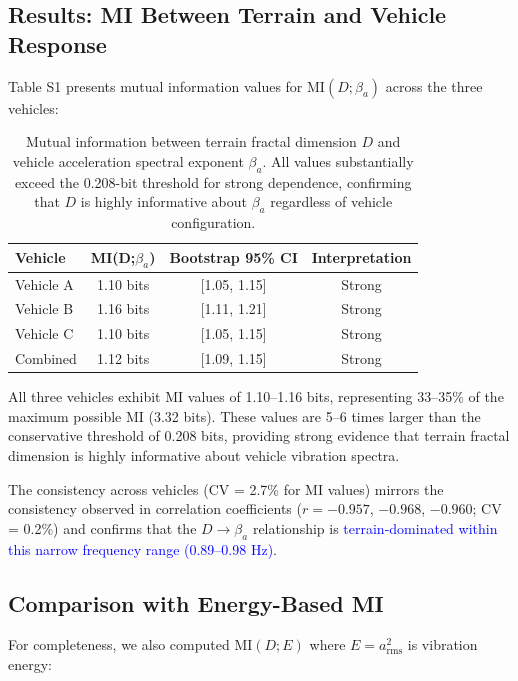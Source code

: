 \documentclass[11pt]{article}
\begin{document}
\subsection{Results: MI Between Terrain and Vehicle Response}

Table S1 presents mutual information values for $\text{MI}(D;\beta_a)$ across the three vehicles:

\begin{table}[h]
\centering
\begin{tabular}{lccc}
\hline
\textbf{Vehicle} & \textbf{MI(D;$\beta_a$)} & \textbf{Bootstrap 95\% CI} & \textbf{Interpretation} \\
\hline
Vehicle A & 1.10 bits & [1.05, 1.15] & Strong \\
Vehicle B & 1.16 bits & [1.11, 1.21] & Strong \\
Vehicle C & 1.10 bits & [1.05, 1.15] & Strong \\
\hline
Combined & 1.12 bits & [1.09, 1.15] & Strong \\
\hline
\end{tabular}
\caption{Mutual information between terrain fractal dimension $D$ and vehicle acceleration spectral exponent $\beta_a$. All values substantially exceed the 0.208-bit threshold for strong dependence, confirming that $D$ is highly informative about $\beta_a$ regardless of vehicle configuration.}
\end{table}

All three vehicles exhibit MI values of 1.10--1.16 bits, representing 33--35\% of the maximum possible MI (3.32 bits). These values are 5--6 times larger than the conservative threshold of 0.208 bits, providing strong evidence that terrain fractal dimension is highly informative about vehicle vibration spectra.

The consistency across vehicles (CV = 2.7\% for MI values) mirrors the consistency observed in correlation coefficients ($r = -0.957$, $-0.968$, $-0.960$; CV = 0.2\%) and confirms that the $D \rightarrow \beta_a$ relationship is \textcolor{blue}{terrain-dominated within this narrow frequency range (0.89--0.98 Hz)}.

\subsection{Comparison with Energy-Based MI}

For completeness, we also computed $\text{MI}(D;E)$ where $E = a_{\text{rms}}^2$ is vibration energy:
\end{document}

